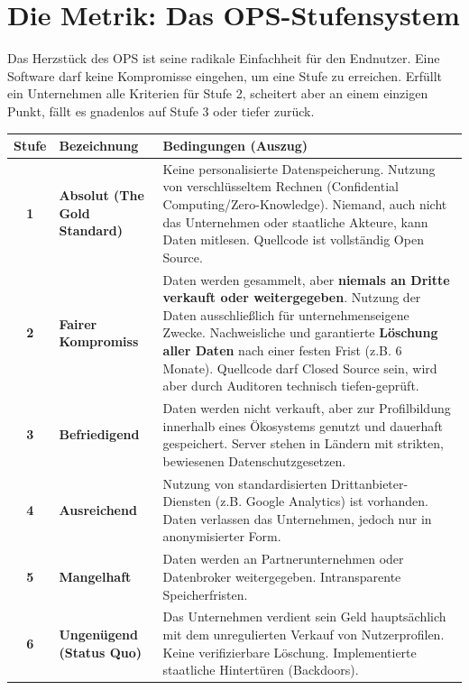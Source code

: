 \documentclass[11pt, a4paper]{article}
\begin{document}
	\newpage
	
	\section{Die Metrik: Das OPS-Stufensystem}
	
	Das Herzstück des OPS ist seine radikale Einfachheit für den Endnutzer. Eine Software darf keine Kompromisse eingehen, um eine Stufe zu erreichen. Erfüllt ein Unternehmen alle Kriterien für Stufe 2, scheitert aber an einem einzigen Punkt, fällt es gnadenlos auf Stufe 3 oder tiefer zurück.
	
	\vspace{0.5cm}
	\begin{tabularx}{\textwidth}{@{} c l X @{}}
		\toprule
		\textbf{Stufe} & \textbf{Bezeichnung} & \textbf{Bedingungen (Auszug)} \\
		\midrule
		\color{grade1}\textbf{1} & \color{grade1}\textbf{Absolut (The Gold Standard)} & 
		Keine personalisierte Datenspeicherung. Nutzung von verschlüsseltem Rechnen (Confidential Computing/Zero-Knowledge). Niemand, auch nicht das Unternehmen oder staatliche Akteure, kann Daten mitlesen. Quellcode ist vollständig Open Source. \\
		\addlinespace
		\color{grade2}\textbf{2} & \color{grade2}\textbf{Fairer Kompromiss} & 
		Daten werden gesammelt, aber \textbf{niemals an Dritte verkauft oder weitergegeben}. Nutzung der Daten ausschließlich für unternehmenseigene Zwecke. Nachweisliche und garantierte \textbf{Löschung aller Daten} nach einer festen Frist (z.B. 6 Monate). Quellcode darf Closed Source sein, wird aber durch Auditoren technisch tiefen-geprüft. \\
		\addlinespace
		\color{grade3}\textbf{3} & \color{grade3}\textbf{Befriedigend} & 
		Daten werden nicht verkauft, aber zur Profilbildung innerhalb eines Ökosystems genutzt und dauerhaft gespeichert. Server stehen in Ländern mit strikten, bewiesenen Datenschutzgesetzen. \\
		\addlinespace
		\color{grade4}\textbf{4} & \color{grade4}\textbf{Ausreichend} & 
		Nutzung von standardisierten Drittanbieter-Diensten (z.B. Google Analytics) ist vorhanden. Daten verlassen das Unternehmen, jedoch nur in anonymisierter Form. \\
		\addlinespace
		\color{grade5}\textbf{5} & \color{grade5}\textbf{Mangelhaft} & 
		Daten werden an Partnerunternehmen oder Datenbroker weitergegeben. Intransparente Speicherfristen. \\
		\addlinespace
		\color{grade6}\textbf{6} & \color{grade6}\textbf{Ungenügend (Status Quo)} & 
		Das Unternehmen verdient sein Geld hauptsächlich mit dem unregulierten Verkauf von Nutzerprofilen. Keine verifizierbare Löschung. Implementierte staatliche Hintertüren (Backdoors). \\
		\bottomrule
	\end{tabularx}
	\vspace{0.5cm}
	
\end{document}
